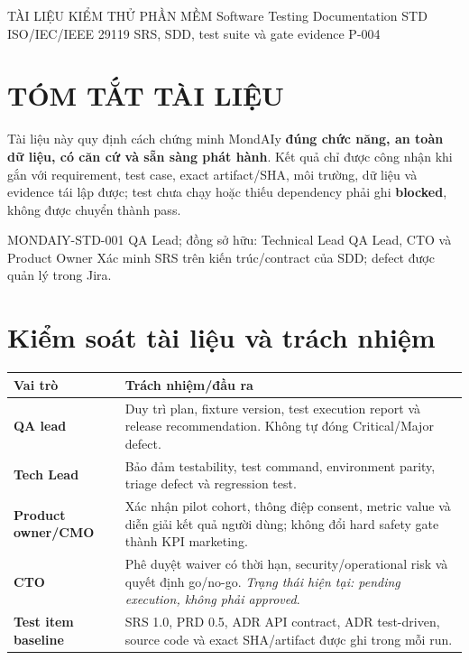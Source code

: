 \documentclass[12pt,a4paper]{article}
\begin{document}
\mondaiycover
  {TÀI LIỆU KIỂM THỬ PHẦN MỀM}
  {Software Testing Documentation}
  {STD}
  {ISO/IEC/IEEE 29119}
  {SRS, SDD, test suite và gate evidence P-004}
\mondaiyfrontmatter

\section*{TÓM TẮT TÀI LIỆU}
\begin{keybox}
Tài liệu này quy định cách chứng minh MondAIy \textbf{đúng chức năng, an toàn dữ
liệu, có căn cứ và sẵn sàng phát hành}. Kết quả chỉ được công nhận khi gắn với
requirement, test case, exact artifact/SHA, môi trường, dữ liệu và evidence tái
lập được; test chưa chạy hoặc thiếu dependency phải ghi \textbf{blocked}, không
được chuyển thành pass.
\end{keybox}

\mondaiymetadata
  {MONDAIY-STD-001}
  {QA Lead; đồng sở hữu: Technical Lead}
  {QA Lead, CTO và Product Owner}
  {Xác minh SRS trên kiến trúc/contract của SDD; defect được quản lý trong Jira.}

\section{Kiểm soát tài liệu và trách nhiệm}
\begin{tabularx}{\textwidth}{>{\bfseries}p{3.3cm}X}
\toprule Vai trò & Trách nhiệm/đầu ra \\ \midrule
QA lead & Duy trì plan, fixture version, test execution report và release recommendation. Không tự đóng Critical/Major defect. \\
Tech Lead & Bảo đảm testability, test command, environment parity, triage defect và regression test. \\
Product owner/CMO & Xác nhận pilot cohort, thông điệp consent, metric value và diễn giải kết quả người dùng; không đổi hard safety gate thành KPI marketing. \\
CTO & Phê duyệt waiver có thời hạn, security/operational risk và quyết định go/no-go. \emph{Trạng thái hiện tại: pending execution, không phải approved}. \\
Test item baseline & SRS 1.0, PRD 0.5, ADR API contract, ADR test-driven, source code và exact SHA/artifact được ghi trong mỗi run. \\
\bottomrule
\end{tabularx}
\end{document}
